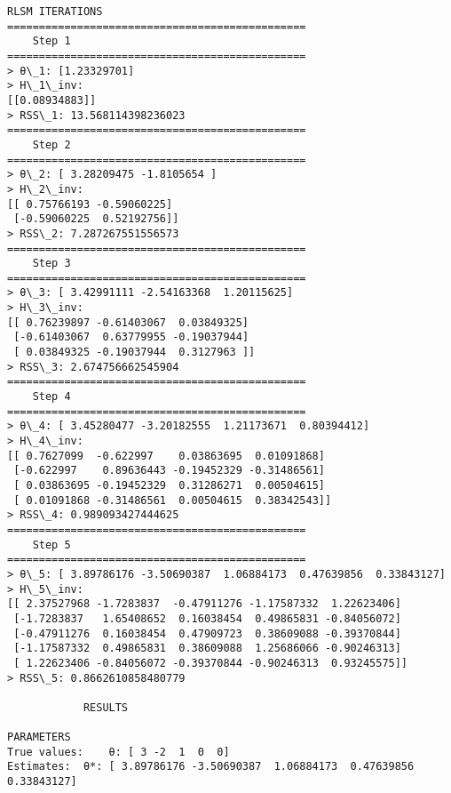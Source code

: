\documentclass[11pt]{article}
\begin{document}
\begin{Verbatim}[commandchars=\\\{\}]
		RLSM ITERATIONS
===============================================
	Step 1
===============================================
> θ\_1: [1.23329701]
> H\_1\_inv:
[[0.08934883]]
> RSS\_1: 13.568114398236023
===============================================
	Step 2
===============================================
> θ\_2: [ 3.28209475 -1.8105654 ]
> H\_2\_inv:
[[ 0.75766193 -0.59060225]
 [-0.59060225  0.52192756]]
> RSS\_2: 7.287267551556573
===============================================
	Step 3
===============================================
> θ\_3: [ 3.42991111 -2.54163368  1.20115625]
> H\_3\_inv:
[[ 0.76239897 -0.61403067  0.03849325]
 [-0.61403067  0.63779955 -0.19037944]
 [ 0.03849325 -0.19037944  0.3127963 ]]
> RSS\_3: 2.674756662545904
===============================================
	Step 4
===============================================
> θ\_4: [ 3.45280477 -3.20182555  1.21173671  0.80394412]
> H\_4\_inv:
[[ 0.7627099  -0.622997    0.03863695  0.01091868]
 [-0.622997    0.89636443 -0.19452329 -0.31486561]
 [ 0.03863695 -0.19452329  0.31286271  0.00504615]
 [ 0.01091868 -0.31486561  0.00504615  0.38342543]]
> RSS\_4: 0.989093427444625
===============================================
	Step 5
===============================================
> θ\_5: [ 3.89786176 -3.50690387  1.06884173  0.47639856  0.33843127]
> H\_5\_inv:
[[ 2.37527968 -1.7283837  -0.47911276 -1.17587332  1.22623406]
 [-1.7283837   1.65408652  0.16038454  0.49865831 -0.84056072]
 [-0.47911276  0.16038454  0.47909723  0.38609088 -0.39370844]
 [-1.17587332  0.49865831  0.38609088  1.25686066 -0.90246313]
 [ 1.22623406 -0.84056072 -0.39370844 -0.90246313  0.93245575]]
> RSS\_5: 0.8662610858480779

			RESULTS

PARAMETERS
True values:	θ: [ 3 -2  1  0  0]
Estimates:	θ*: [ 3.89786176 -3.50690387  1.06884173  0.47639856  0.33843127]

    \end{Verbatim}

    \begin{center}
    \end{center}
    { \hspace*{\fill} \\}
    
\end{document}
